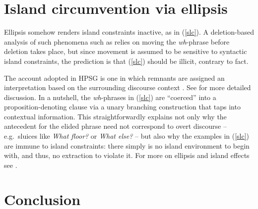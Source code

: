 \documentclass[output=paper
 	        ,biblatex
                ,babelshorthands
                ,newtxmath
                ,draftmode
                ,colorlinks, citecolor=brown
]{langscibook}
\begin{document}
\section{Island circumvention via ellipsis}

Ellipsis somehow renders island constraints inactive, as in (\ref{slc}). A deletion-based analysis
of such phenomena such as \citet{merchantbook} relies on moving the \emph{wh}-phrase before deletion
takes place, but since movement is assumed to be sensitive to syntactic island constraints, the
prediction is that (\ref{slc}) should be illicit, contrary to fact.

\eal  \label{slc}



\zl

The account adopted in HPSG is one in which remnants are assigned an interpretation based on the
surrounding discourse context \citep{ginzsag,Culicover:Jackendoff:05,jacobson08,sagn}.  See
 for more detailed discussion. In a nutshell, the \emph{wh}-phrases in
(\ref{slc}) are ``coerced'' into a proposition-denoting clause via a unary branching construction
that taps into contextual information.  This straightforwardly explains not only why the antecedent
for the elided phrase need not correspond to overt discourse -- e.g.\ sluices like \emph{What
  floor?} or \emph{What else?} -- but also why the examples in (\ref{slc}) are immune to island
constraints: there simply is no island environment to begin with, and thus, no extraction to violate
it. For more on ellipsis and island effects see \citet[108--109]{CP2020a-u}.




\section{Conclusion}
\end{document}
